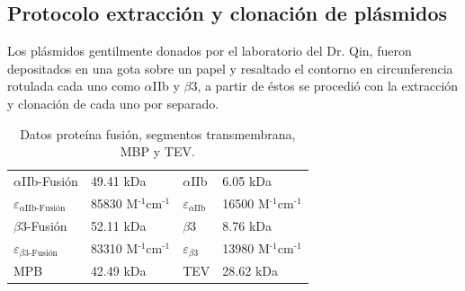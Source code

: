 \begin{appendix}

\chapter{Protocolo extracción y clonación de plásmidos}\label{Protocolo Plasmido}

Los plásmidos gentilmente donados por el laboratorio del Dr. Qin, fueron depositados en una gota sobre un papel y resaltado el contorno en circunferencia rotulada cada uno como $\alpha$IIb y $\beta$3, a partir de éstos se procedió con la extracción y clonación de cada uno por separado.


\begin{table}[]
  \begin{center}
  \centering
  \captionsetup{justification=centering}  %
    \caption{Datos proteína fusión, segmentos transmembrana, MBP y TEV.}
    \label{tab:dat_proteina}
    \begin{tabular}{l l| l l }
      \toprule %

		$\alpha$IIb-Fusión & 49.41 kDa 	& $\alpha$IIb 	& 6.05 kDa \\ 
		{\Large{$\varepsilon$}}$_{\alpha \text{IIb-Fusión}}$ & 85830 M$^{\text{-1}}$cm$^{\text{-1}}$ & {\Large{$\varepsilon$}}$_{\alpha \text{IIb}}$ & 16500 M$^{\text{-1}}$cm$^{\text{-1}}$ \\
		$\beta$3-Fusión 	& 52.11 kDa 	& $\beta$3 	& 8.76 kDa \\
		{\Large{$\varepsilon$}}$_{\beta \text{3-Fusión}}$ & 83310 M$^{\text{-1}}$cm$^{\text{-1}}$ & {\Large{$\varepsilon$}}$_{\beta \text{3}}$ & 13980 M$^{\text{-1}}$cm$^{\text{-1}}$ \\
      \midrule %
      MPB & 42.49 kDa 	& TEV 	& 28.62 kDa \\ 
      
      
      \bottomrule %
    \end{tabular}
  \end{center}
\end{table}



    \begin{itemize}
     

\end{itemize}
\end{appendix}

